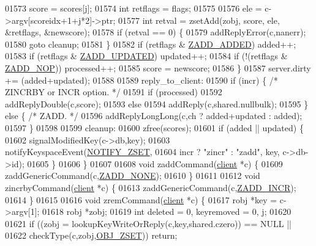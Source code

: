 \begin{DoxyCode}
01573         score = scores[j];
01574         \textcolor{keywordtype}{int} retflags = flags;
01575 
01576         ele = c->argv[scoreidx+1+j*2]->ptr;
01577         \textcolor{keywordtype}{int} retval = zsetAdd(zobj, score, ele, &retflags, &newscore);
01578         \textcolor{keywordflow}{if} (retval == 0) \{
01579             addReplyError(c,nanerr);
01580             \textcolor{keywordflow}{goto} cleanup;
01581         \}
01582         \textcolor{keywordflow}{if} (retflags & \hyperlink{server_8h_a2c0f3e2c3a5c73496b732648c69eda18}{ZADD\_ADDED}) added++;
01583         \textcolor{keywordflow}{if} (retflags & \hyperlink{server_8h_aabb6bb7a2a2e73ab9fcda97cf704761b}{ZADD\_UPDATED}) updated++;
01584         \textcolor{keywordflow}{if} (!(retflags & \hyperlink{server_8h_afd0096ac4bedddb9b0b7f27396839c06}{ZADD\_NOP})) processed++;
01585         score = newscore;
01586     \}
01587     server.dirty += (added+updated);
01588 
01589 reply\_to\_client:
01590     \textcolor{keywordflow}{if} (incr) \{ \textcolor{comment}{/* ZINCRBY or INCR option. */}
01591         \textcolor{keywordflow}{if} (processed)
01592             addReplyDouble(c,score);
01593         \textcolor{keywordflow}{else}
01594             addReply(c,shared.nullbulk);
01595     \} \textcolor{keywordflow}{else} \{ \textcolor{comment}{/* ZADD. */}
01596         addReplyLongLong(c,ch ? added+updated : added);
01597     \}
01598 
01599 cleanup:
01600     zfree(scores);
01601     \textcolor{keywordflow}{if} (added || updated) \{
01602         signalModifiedKey(c->db,key);
01603         notifyKeyspaceEvent(\hyperlink{server_8h_ab8516a5a3ff1b9eb5f1cb303abef0d2f}{NOTIFY\_ZSET},
01604             incr ? \textcolor{stringliteral}{"zincr"} : \textcolor{stringliteral}{"zadd"}, key, c->db->id);
01605     \}
01606 \}
01607 
01608 \textcolor{keywordtype}{void} zaddCommand(\hyperlink{structclient}{client} *c) \{
01609     zaddGenericCommand(c,\hyperlink{server_8h_aa8b724e5b88e5d650fb872e66ca52995}{ZADD\_NONE});
01610 \}
01611 
01612 \textcolor{keywordtype}{void} zincrbyCommand(\hyperlink{structclient}{client} *c) \{
01613     zaddGenericCommand(c,\hyperlink{server_8h_aa31f5564c57b55123a4e2d6a5eb599cf}{ZADD\_INCR});
01614 \}
01615 
01616 \textcolor{keywordtype}{void} zremCommand(\hyperlink{structclient}{client} *c) \{
01617     robj *key = c->argv[1];
01618     robj *zobj;
01619     \textcolor{keywordtype}{int} deleted = 0, keyremoved = 0, j;
01620 
01621     \textcolor{keywordflow}{if} ((zobj = lookupKeyWriteOrReply(c,key,shared.czero)) == NULL ||
01622         checkType(c,zobj,\hyperlink{server_8h_a8c356422ddbc03bd77694880a30a1953}{OBJ\_ZSET})) \textcolor{keywordflow}{return};

\end{DoxyCode}
